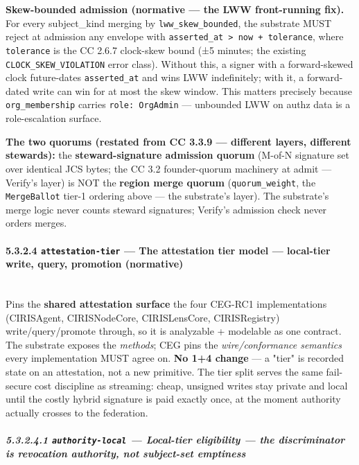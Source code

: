 \documentclass[11pt]{article}
\begin{document}
\textbf{Skew-bounded admission (normative — the LWW front-running fix).} For every subject\_kind merging by \texttt{lww\_skew\_bounded}, the substrate MUST reject at admission any envelope with \texttt{asserted\_at > now + tolerance}, where \texttt{tolerance} is the CC 2.6.7 clock-skew bound (±5 minutes; the existing \texttt{CLOCK\_SKEW\_VIOLATION} error class). Without this, a signer with a forward-skewed clock future-dates \texttt{asserted\_at} and wins LWW indefinitely; with it, a forward-dated write can win for at most the skew window. This matters precisely because \texttt{org\_membership} carries \texttt{role: OrgAdmin} — unbounded LWW on authz data is a role-escalation surface.


\textbf{The two quorums (restated from CC 3.3.9 — different layers, different stewards):} the \textbf{steward-signature admission quorum} (M-of-N signature set over identical JCS bytes; the CC 3.2 founder-quorum machinery at admit — Verify's layer) is NOT the \textbf{region merge quorum} (\texttt{quorum\_weight}, the \texttt{MergeBallot} tier-1 ordering above — the substrate's layer). The substrate's merge logic never counts steward signatures; Verify's admission check never orders merges.


\paragraph{5.3.2.4 \texttt{attestation-tier} — The attestation tier model — local-tier write, query, promotion (normative)}\mbox{}\\


Pins the \textbf{shared attestation surface} the four CEG-RC1 implementations (CIRISAgent, CIRISNodeCore, CIRISLensCore, CIRISRegistry) write/query/promote through, so it is analyzable + modelable as one contract. The substrate exposes the \textit{methods}; CEG pins the \textit{wire/conformance semantics} every implementation MUST agree on. \textbf{No 1+4 change} — a "tier" is recorded state on an attestation, not a new primitive. The tier split serves the same fail-secure cost discipline as streaming: cheap, unsigned writes stay private and local until the costly hybrid signature is paid exactly once, at the moment authority actually crosses to the federation.


\subparagraph{5.3.2.4.1 \texttt{authority-local} — Local-tier eligibility — the discriminator is \textit{revocation authority}, not subject-set emptiness}\mbox{}\\
\end{document}
